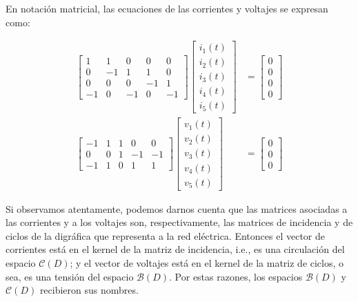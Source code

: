 En notación matricial, las ecuaciones de las corrientes y voltajes se expresan como:

\begin{align*}
\begin{bmatrix}
1 & 1 & 0 & 0 & 0\\ 
0 &-1  & 1 & 1 & 0\\ 
0 & 0 & 0 & -1 & 1\\ 
-1 & 0 & -1 & 0 & -1
\end{bmatrix} \begin{bmatrix}
i_{1}(t)\\ 
i_{2}(t)\\ 
i_{3}(t)\\ 
i_{4}(t)\\ 
i_{5}(t)
\end{bmatrix}&=\begin{bmatrix}
0\\ 
0\\ 
0\\ 
0
\end{bmatrix} \\
\begin{bmatrix}
-1 & 1 & 1 & 0 & 0\\ 
0 &0  & 1 & -1 & -1\\ 
-1 & 1 & 0 & 1 & 1
\end{bmatrix} \begin{bmatrix}
v_{1}(t)\\ 
v_{2}(t)\\ 
v_{3}(t)\\ 
v_{4}(t)\\ 
v_{5}(t)
\end{bmatrix}&=\begin{bmatrix}
0\\ 
0\\ 
0
\end{bmatrix}    
\end{align*}

Si observamos atentamente, podemos darnos cuenta que las matrices asociadas a las corrientes y a los voltajes son, respectivamente, las matrices de incidencia y de ciclos de la digráfica que representa a la red eléctrica. Entonces el vector de corrientes está en el kernel de la matriz de incidencia, i.e., es una circulación del espacio $\mathcal{C}(D)$; y el vector de voltajes está en el kernel de la matriz de ciclos, o sea, es una tensión del espacio $\mathcal{B}(D)$. Por estas razones, los espacios $\mathcal{B}(D)$ y $\mathcal{C}(D)$ recibieron sus nombres.

